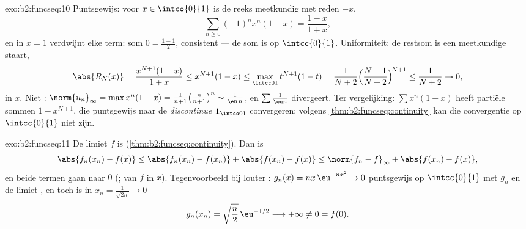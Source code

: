 \begin{solution}{exo:b2:funcseq:10}
Puntsgewijs: voor $x \in \intco{0}{1}$ is de reeks meetkundig met
reden $-x$,
\[
\sum_{n\geq0}(-1)^n x^n(1-x) = \frac{1-x}{1+x},
\]
en in $x = 1$ verdwijnt elke term: som $0 = \frac{1-1}{2}$,
consistent --- de som is  op $\intcc{0}{1}$. Uniformiteit:
de restsom is een meetkundige staart,
\[
\abs{R_N(x)} = \frac{x^{N+1}(1-x)}{1+x} \leq x^{N+1}(1 - x)
\leq \max_{\intcc01} t^{N+1}(1-t)
= \frac{1}{N+2}\Bigl(\frac{N+1}{N+2}\Bigr)^{\!N+1}
\leq \frac{1}{N+2} \to 0 ,
\]
 in $x$. Niet : $\norm{u_n}_\infty = \max x^n(1-x) =
\frac{1}{n+1}\bigl(\frac{n}{n+1}\bigr)^n \sim \frac{1}{\eu\,n}$, en
$\sum \frac1{\eu n}$ divergeert. Ter vergelijking: $\sum x^n(1-x)$
heeft partiële sommen $1 - x^{N+1}$, die puntsgewijs naar de
\emph{discontinue} $\mathbf 1_{\intco01}$ convergeren; volgens
\cref{thm:b2:funcseq:continuity} kan die convergentie op
$\intcc{0}{1}$ niet  zijn.
\end{solution}

\begin{solution}{exo:b2:funcseq:11}
De limiet $f$ is  (\cref{thm:b2:funcseq:continuity}). Dan
is
\[
\abs{f_n(x_n) - f(x)}
\leq \abs{f_n(x_n) - f(x_n)} + \abs{f(x_n) - f(x)}
\leq \norm{f_n - f}_\infty + \abs{f(x_n) - f(x)} ,
\]
en beide termen gaan naar $0$ (; 
van $f$ in $x$). Tegenvoorbeeld bij louter : $g_n(x) = nx\,\eu^{-nx^2} \to 0$ puntsgewijs op
$\intcc{0}{1}$ met $g_n$ en de limiet , en toch is in $x_n =
\frac{1}{\sqrt{2n}} \to 0$
\[
g_n(x_n) = \sqrt{\frac n2}\,\eu^{-1/2} \longrightarrow +\infty
\neq 0 = f(0) .
\]
\end{solution}

